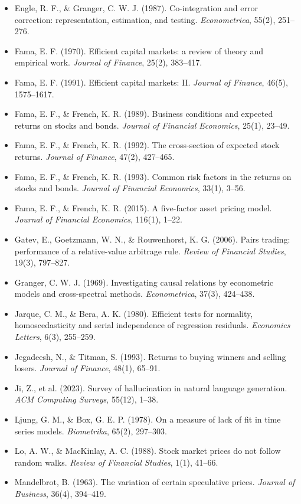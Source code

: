 \documentclass[11pt,a4paper]{article}
\begin{document}
\begin{itemize}[leftmargin=1.2em,labelsep=0.4em,label={}]
\item Engle, R. F., \& Granger, C. W. J. (1987). Co-integration and error correction: representation, estimation, and testing. \emph{Econometrica}, 55(2), 251--276.
\item Fama, E. F. (1970). Efficient capital markets: a review of theory and empirical work. \emph{Journal of Finance}, 25(2), 383--417.
\item Fama, E. F. (1991). Efficient capital markets: II. \emph{Journal of Finance}, 46(5), 1575--1617.
\item Fama, E. F., \& French, K. R. (1989). Business conditions and expected returns on stocks and bonds. \emph{Journal of Financial Economics}, 25(1), 23--49.
\item Fama, E. F., \& French, K. R. (1992). The cross-section of expected stock returns. \emph{Journal of Finance}, 47(2), 427--465.
\item Fama, E. F., \& French, K. R. (1993). Common risk factors in the returns on stocks and bonds. \emph{Journal of Financial Economics}, 33(1), 3--56.
\item Fama, E. F., \& French, K. R. (2015). A five-factor asset pricing model. \emph{Journal of Financial Economics}, 116(1), 1--22.
\item Gatev, E., Goetzmann, W. N., \& Rouwenhorst, K. G. (2006). Pairs trading: performance of a relative-value arbitrage rule. \emph{Review of Financial Studies}, 19(3), 797--827.
\item Granger, C. W. J. (1969). Investigating causal relations by econometric models and cross-spectral methods. \emph{Econometrica}, 37(3), 424--438.
\item Jarque, C. M., \& Bera, A. K. (1980). Efficient tests for normality, homoscedasticity and serial independence of regression residuals. \emph{Economics Letters}, 6(3), 255--259.
\item Jegadeesh, N., \& Titman, S. (1993). Returns to buying winners and selling losers. \emph{Journal of Finance}, 48(1), 65--91.
\item Ji, Z., et al. (2023). Survey of hallucination in natural language generation. \emph{ACM Computing Surveys}, 55(12), 1--38.
\item Ljung, G. M., \& Box, G. E. P. (1978). On a measure of lack of fit in time series models. \emph{Biometrika}, 65(2), 297--303.
\item Lo, A. W., \& MacKinlay, A. C. (1988). Stock market prices do not follow random walks. \emph{Review of Financial Studies}, 1(1), 41--66.
\item Mandelbrot, B. (1963). The variation of certain speculative prices. \emph{Journal of Business}, 36(4), 394--419.

\end{itemize}
\end{document}
